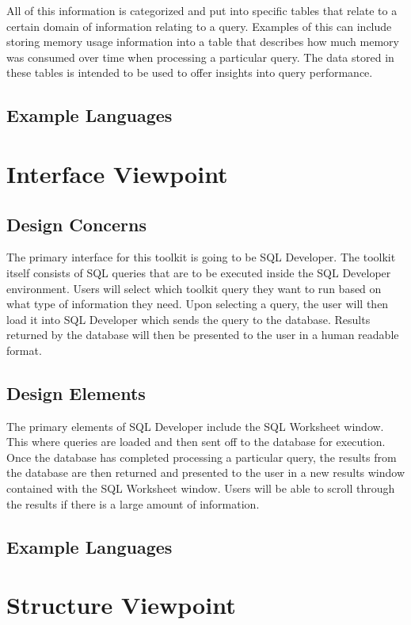 \documentclass[draftclsnofoot, onecolumn, compsoc, 10pt]{IEEEtran}
\begin{document}
All of this information is categorized and put into specific tables that relate to a certain domain of information relating to a query.
Examples of this can include storing memory usage information into a table that describes how much memory was consumed over time when processing a particular query.
The data stored in these tables is intended to be used to offer insights into query performance.

\subsection{Example Languages}

\section{Interface Viewpoint}
\subsection{Design Concerns}
The primary interface for this toolkit is going to be SQL Developer. The toolkit itself consists of SQL queries that are to be executed inside the SQL Developer environment.
Users will select which toolkit query they want to run based on what type of information they need. Upon selecting a query, the user will then load it into SQL Developer which sends the query to the database.
Results returned by the database will then be presented to the user in a human readable format.
\subsection{Design Elements}
The primary elements of SQL Developer include the SQL Worksheet window.
This where queries are loaded and then sent off to the database for execution.
Once the database has completed processing a particular query, the results from the database are then returned and presented to the user in a new results window contained with the SQL Worksheet window.
Users will be able to scroll through the results if there is a large amount of information.

\subsection{Example Languages}

\section{Structure Viewpoint}
\end{document}
